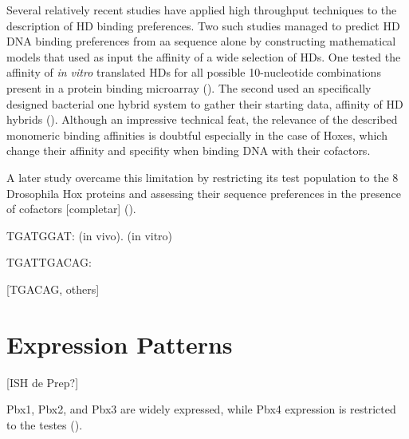Several relatively recent studies have applied high throughput techniques to the description of \ac{HD} binding preferences. Two such studies managed to predict \ac{HD} DNA binding preferences from \ac{aa} sequence alone by constructing mathematical models that used as input the affinity of a wide selection of \acp{HD}. One tested the affinity of \textit{in vitro} translated \acp{HD} for all possible 10-nucleotide combinations present in a protein binding microarray (\cite{Berger2008}). The second used an specifically designed bacterial one hybrid system to gather their starting data, affinity of \ac{HD} hybrids (\cite{Noyes2008}). Although an impressive technical feat, the relevance of the described monomeric binding affinities is doubtful especially in the case of Hoxes, which change their affinity and specifity when binding DNA with their cofactors. 

A later study overcame this limitation by restricting its test population to the 8 Drosophila Hox proteins and assessing their sequence preferences in the presence of cofactors [completar] (\cite{Slattery2011}).




TGATGGAT: \cite{Poepperl1995,Chan1997} (in vivo). \cite{Chang1997} (in vitro)

TGATTGACAG: \cite{Knoepfler1997}

[TGACAG, others]





\section{Expression Patterns}

[ISH de Prep?]

Pbx1, Pbx2, and Pbx3 are widely expressed,
while Pbx4 expression is restricted to the testes
(\cite{Monica1991, Wagner2001}).


